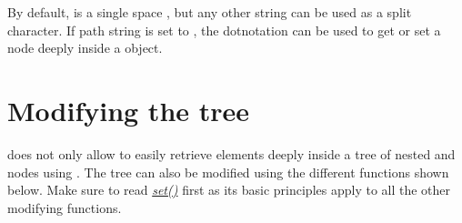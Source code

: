 \documentclass[a4paper,10pt,english]{sphinxmanual}
\begin{document}
\sphinxAtStartPar
By default,  is a single space , but any other string can be used as a split character. If path string is set to , the dot\sphinxhyphen{}notation can be used to get or set a node deeply inside a \sphinxhyphen{}object.

\begin{sphinxVerbatim}[commandchars=\\\{\},numbers=left,firstnumber=1,stepnumber=1]
  
    
   
    
  
    
\end{sphinxVerbatim}


\section{Modifying the tree}
\label{\detokenize{README:modifying-the-tree}}
\sphinxAtStartPar
{} does not only allow to easily retrieve elements deeply inside a tree of nested \sphinxhyphen{} and \sphinxhyphen{}nodes using {\hyperref[\detokenize{README:the-path-parameter}]{\emph{}}}. The tree can also be modified using the different functions shown below. Make sure to read {\hyperref[\detokenize{README:set----adding-and-overwriting-elements}]{\emph{set()}}} first as its basic principles apply to all the other modifying functions.
\end{document}

